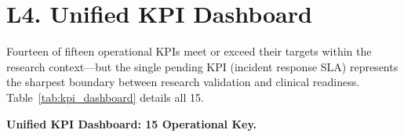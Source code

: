 \section*{L4. Unified KPI Dashboard}
\label{sec:appl_kpi_dashboard}

Fourteen of fifteen operational KPIs meet or exceed their targets within the research context---but the single pending KPI (incident response SLA) represents the sharpest boundary between research validation and clinical readiness. Table~\ref{tab:kpi_dashboard} details all 15.

\noindent\textbf{Unified KPI Dashboard: 15 Operational Key.}

